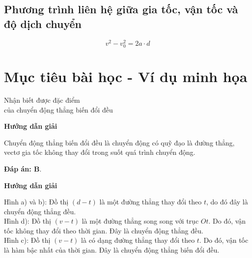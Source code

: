 \subsection{Phương trình liên hệ giữa gia tốc, vận tốc và độ dịch chuyển}
$$v^2-v^2_0=2a\cdot d$$

\section{Mục tiêu bài học - Ví dụ minh họa}
\begin{dang}{Nhận biết được đặc điểm \\của chuyển động thẳng biến đổi đều}
	{	\begin{center}
			\textbf{Hướng dẫn giải}
		\end{center}
		
		Chuyển động thẳng biến đổi đều là chuyển động có quỹ đạo là đường thẳng, vectơ gia tốc không thay đổi trong suốt quá trình chuyển động.
		
		\textbf{Đáp án: B}.
	}
{\begin{center}
		\textbf{Hướng dẫn giải}
	\end{center}
Hình a) và b): Đồ thị $\left(d - t\right)$ là một đường thẳng thay đổi theo $t$, do đó đây là chuyển động thẳng đều.\\
Hình d): Đồ thị $\left( v - t\right)$ là một đường thẳng song song với trục $Ot$. Do đó, vận tốc không thay đổi theo thời gian. Đây là chuyển động thẳng đều.\\
Hình c): Đồ thị $\left(v - t\right)$ là có dạng đường thẳng thay đổi theo $t$. Do đó, vận tốc là hàm bậc nhất của thời gian. Đây là chuyển động thẳng biến đổi đều.
}
\end{dang}

